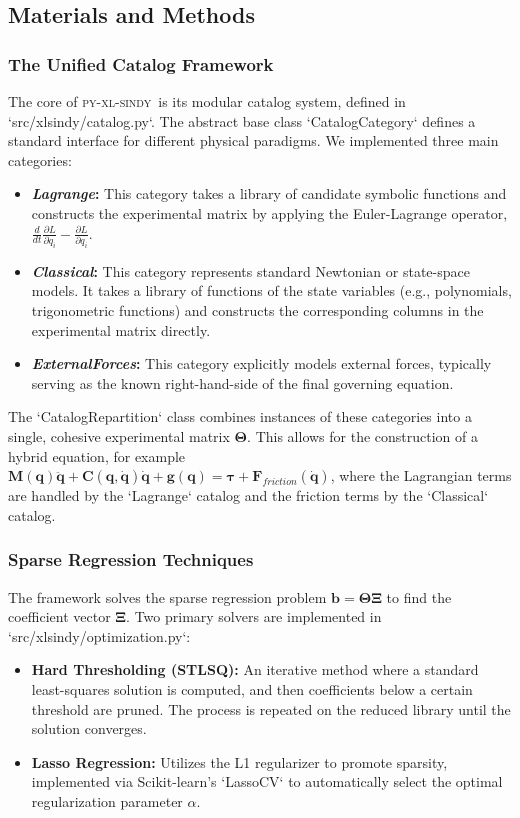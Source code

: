 \documentclass[12pt]{article}
\newcommand{\frameworkname}{\textsc{py-xl-sindy}}
\newcommand{\lagrangecat}{\textit{Lagrange}}
\newcommand{\classicalcat}{\textit{Classical}}
\newcommand{\forcescat}{\textit{ExternalForces}}
\begin{document}
\subsection*{Materials and Methods}

\subsubsection*{The Unified Catalog Framework}
The core of \frameworkname\ is its modular catalog system, defined in `src/xlsindy/catalog.py`. The abstract base class `CatalogCategory` defines a standard interface for different physical paradigms. We implemented three main categories:
\begin{itemize}
    \item \textbf{\lagrangecat:} This category takes a library of candidate symbolic functions and constructs the experimental matrix by applying the Euler-Lagrange operator, $\frac{d}{dt}\frac{\partial L}{\partial \dot{q}_i} - \frac{\partial L}{\partial q_i}$.
    \item \textbf{\classicalcat:} This category represents standard Newtonian or state-space models. It takes a library of functions of the state variables (e.g., polynomials, trigonometric functions) and constructs the corresponding columns in the experimental matrix directly.
    \item \textbf{\forcescat:} This category explicitly models external forces, typically serving as the known right-hand-side of the final governing equation.
\end{itemize}
The `CatalogRepartition` class combines instances of these categories into a single, cohesive experimental matrix $\mathbf{\Theta}$. This allows for the construction of a hybrid equation, for example $\mathbf{M}(\mathbf{q})\ddot{\mathbf{q}} + \mathbf{C}(\mathbf{q},\dot{\mathbf{q}})\dot{\mathbf{q}} + \mathbf{g}(\mathbf{q}) = \mathbf{\tau} + \mathbf{F}_{friction}(\dot{\mathbf{q}})$, where the Lagrangian terms are handled by the `Lagrange` catalog and the friction terms by the `Classical` catalog.

\subsubsection*{Sparse Regression Techniques}
The framework solves the sparse regression problem $\mathbf{b} = \mathbf{\Theta}\mathbf{\Xi}$ to find the coefficient vector $\mathbf{\Xi}$. Two primary solvers are implemented in `src/xlsindy/optimization.py`:
\begin{itemize}
    \item \textbf{Hard Thresholding (STLSQ):} An iterative method where a standard least-squares solution is computed, and then coefficients below a certain threshold are pruned. The process is repeated on the reduced library until the solution converges.
    \item \textbf{Lasso Regression:} Utilizes the L1 regularizer to promote sparsity, implemented via Scikit-learn's `LassoCV` to automatically select the optimal regularization parameter $\alpha$.
\end{itemize}
\end{document}
